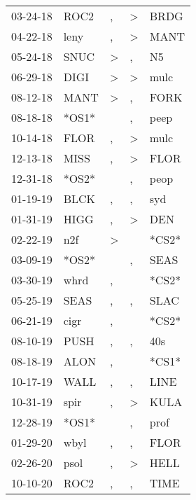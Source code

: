 \begin{supertabular}{lllll}
 03-24-18 &   ROC2 &             , &  \textgreater &   BRDG \\
 04-22-18 &   leny &             , &  \textgreater &   MANT \\
 05-24-18 &   SNUC &  \textgreater &             , &     N5 \\
 06-29-18 &   DIGI &  \textgreater &  \textgreater &   mulc \\
 08-12-18 &   MANT &  \textgreater &             , &   FORK \\
 08-18-18 &  *OS1* &               &             , &   peep \\
 10-14-18 &   FLOR &             , &  \textgreater &   mulc \\
 12-13-18 &   MISS &             , &  \textgreater &   FLOR \\
 12-31-18 &  *OS2* &               &             , &   peop \\
 01-19-19 &   BLCK &             , &             , &    syd \\
 01-31-19 &   HIGG &             , &  \textgreater &    DEN \\
 02-22-19 &    n2f &  \textgreater &               &  *CS2* \\
 03-09-19 &  *OS2* &               &             , &   SEAS \\
 03-30-19 &   whrd &             , &               &  *CS2* \\
 05-25-19 &   SEAS &             , &             , &   SLAC \\
 06-21-19 &   cigr &             , &               &  *CS2* \\
 08-10-19 &   PUSH &             , &             , &    40s \\
 08-18-19 &   ALON &             , &               &  *CS1* \\
 10-17-19 &   WALL &             , &             , &   LINE \\
 10-31-19 &   spir &             , &  \textgreater &   KULA \\
 12-28-19 &  *OS1* &               &             , &   prof \\
 01-29-20 &   wbyl &             , &             , &   FLOR \\
 02-26-20 &   psol &             , &  \textgreater &   HELL \\
 10-10-20 &   ROC2 &             , &             , &   TIME \\
\end{supertabular}
